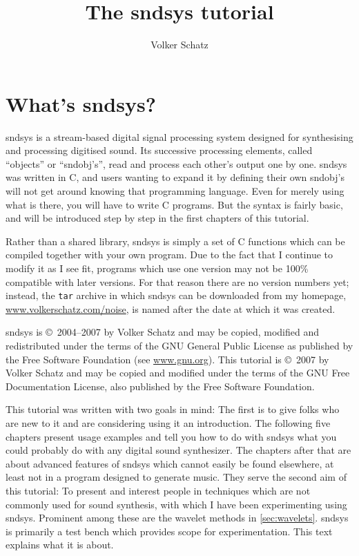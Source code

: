 \documentclass{article}
\def\s{{\sc sndsys} }
\def\sn{{\sc sndsys}}
\begin{document}
\title{The \s tutorial}
\author{Volker Schatz}

\maketitle

\tableofcontents


\section{What's \sn?}

\s is a stream-based digital signal processing system designed for synthesising
and processing digitised sound.  Its successive processing elements, called
``objects'' or ``sndobj's'', read and process each other's output one by one.
\s was written in C, and users wanting to expand it by defining their own
sndobj's will not get around knowing that programming language.  Even for
merely using what is there, you will have to write C programs.  But the syntax
is fairly basic, and will be introduced step by step in the first chapters of
this tutorial.

Rather than a shared library, \s is simply a set of C functions which can be
compiled together with your own program.  Due to the fact that I continue to
modify it as I see fit, programs which use one version may not be 100\%
compatible with later versions.  For that reason there are no version numbers
yet; instead, the {\tt tar} archive in which an be downloaded from my
homepage, \url{www.volkerschatz.com/noise}, is named after the date at
which it was created.

\s is \copyright\ 2004--2007 by Volker Schatz and may  be copied, modified and
redistributed under the terms of the GNU General Public License as published by
the Free Software Foundation (see \url{www.gnu.org}).  This tutorial is
\copyright\ 2007 by Volker Schatz and may be copied and modified under the
terms of the GNU Free Documentation License, also  published by the Free
Software Foundation.

This tutorial was written with two goals in mind:  The first is to give folks
who are new to it and are considering using it an introduction.  The following
five chapters present usage examples and tell you how to do with \s what you
could probably do with any digital sound synthesizer.  The chapters after that
are about advanced features of \s which cannot easily be found elsewhere, at
least not in a program designed to generate music.  They serve the second aim
of this tutorial:  To present and interest people in techniques which are not
commonly used for sound synthesis, with which I have been experimenting using 
\sn.  Prominent among these are the wavelet methods in \autoref{sec:wavelets}.
\s is primarily a test bench which provides scope for experimentation.  This
text explains what it is about.
\end{document}
